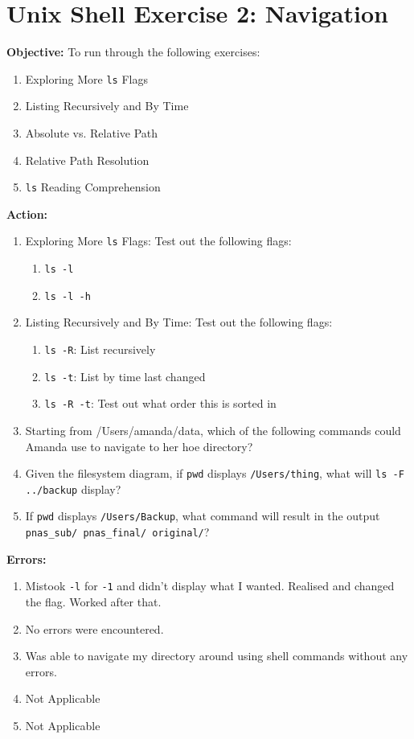 \documentclass{article}
\begin{document}
\section{Unix Shell Exercise 2: Navigation}
\textbf{Objective:} To run through the following exercises:
\begin{enumerate}
    \item Exploring More \verb|ls| Flags
    \item Listing Recursively and By Time
    \item Absolute vs. Relative Path 
    \item Relative Path Resolution
    \item \verb|ls| Reading Comprehension
\end{enumerate}
\textbf{Action:}
\begin{enumerate}
    \item Exploring More \verb|ls| Flags: Test out the following flags:
    \begin{enumerate}
        \item \verb|ls -l|
        \item \verb|ls -l -h|
    \end{enumerate}
    \item Listing Recursively and By Time: Test out the following flags:
    \begin{enumerate}
        \item \verb|ls -R|: List recursively
        \item \verb|ls -t|: List by time last changed
        \item \verb|ls -R -t|: Test out what order this is sorted in
    \end{enumerate}
    \item Starting from /Users/amanda/data, which of the following commands could Amanda use to navigate to her hoe directory?
    \item Given the filesystem diagram, if \verb|pwd| displays \verb|/Users/thing|, what will \verb|ls -F ../backup| display?
    \item If \verb|pwd| displays \verb|/Users/Backup|, what command will result in the output \verb|pnas_sub/ pnas_final/ original/|?
\end{enumerate}
\textbf{Errors:}
\begin{enumerate}
    \item Mistook \verb|-l| for \verb|-1| and didn't display what I wanted. Realised and changed the flag. Worked after that.
    \item No errors were encountered.
    \item Was able to navigate my directory around using shell commands without any errors.
    \item Not Applicable
    \item Not Applicable
\end{enumerate}
\end{document}
